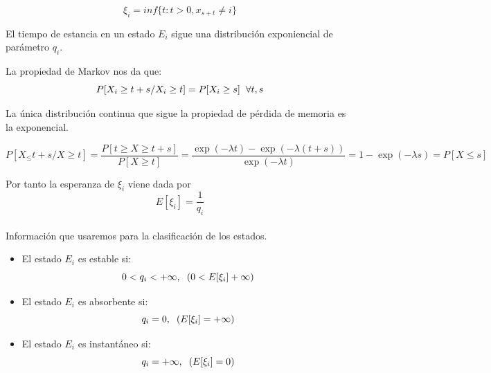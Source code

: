 \documentclass[12pt,a4paper]{article}
\begin{document}
\begin{equation*}
	\xi_{i}=inf \{ t:t > 0, x_{s+t}\neq i \}
\end{equation*}

\begin{prop}
	
El tiempo de estancia en un estado $E_{i}$ sigue una distribución exponiencial de parámetro $q_{i}$.

\end{prop}


La propiedad de Markov nos da que:
\begin{equation*}
 P[X_{i} \geq t+s/X_{i} \geq t]= P[X_{i}  \geq s] \hspace{0.2cm} \forall t, s
\end{equation*}

La única distribución continua que sigue la propiedad de pérdida de memoria es la exponencial.

\begin{equation*}
	P[X_ \leq t+s/X \geq t]= \frac{P[t  \geq X  \geq t+s]}{P[X \geq t]}=\frac{\exp(-\lambda t)-\exp(-\lambda(t+s))}{\exp(-\lambda t)}=1-\exp(-\lambda s)=P[X\leq s]
\end{equation*}


Por tanto la esperanza de $\xi_{i}$ viene dada por $$E[\xi_{i}]= \frac{1}{q_{i}}$$
\\

Información que usaremos para la clasificación de los estados.
\\


\begin{itemize}
	\item El estado $E_{i}$ es estable si:
	 \begin{equation*}
	 	0< q_{i} < +\infty, \hspace{0.2cm} (0<E[\xi_{i}]+\infty) 
	 \end{equation*}
    \item El estado $E_{i}$ es absorbente si:
        \begin{equation*}
    	q_{i}=0, \hspace{0.2cm} (E[\xi_{i}]=+\infty)
        \end{equation*} 
     \item El estado  $E_{i}$ es instantáneo si:  
      \begin{equation*}
      	q_{i}=+\infty, \hspace{0.2cm} (E[\xi_{i}]=0)
      \end{equation*}
      
\end{itemize}
\end{document}
